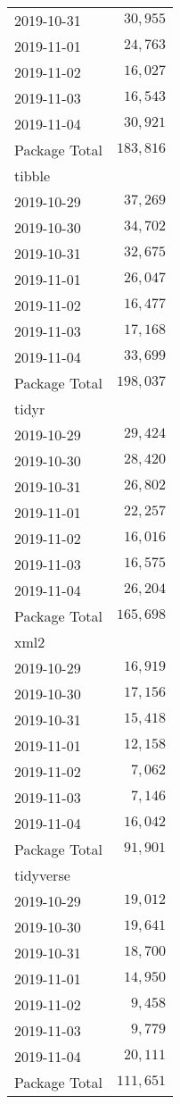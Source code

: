 \documentclass[]{article}
\begin{document}
\begin{longtable}{lr}
2019-10-31 & $30,955$ \\ 
2019-11-01 & $24,763$ \\ 
2019-11-02 & $16,027$ \\ 
2019-11-03 & $16,543$ \\ 
2019-11-04 & $30,921$ \\ 
\midrule 
Package Total & $183,816$ \\ 
\midrule
\multicolumn{1}{l}{tibble} \\ 
\midrule
2019-10-29 & $37,269$ \\ 
2019-10-30 & $34,702$ \\ 
2019-10-31 & $32,675$ \\ 
2019-11-01 & $26,047$ \\ 
2019-11-02 & $16,477$ \\ 
2019-11-03 & $17,168$ \\ 
2019-11-04 & $33,699$ \\ 
\midrule 
Package Total & $198,037$ \\ 
\midrule
\multicolumn{1}{l}{tidyr} \\ 
\midrule
2019-10-29 & $29,424$ \\ 
2019-10-30 & $28,420$ \\ 
2019-10-31 & $26,802$ \\ 
2019-11-01 & $22,257$ \\ 
2019-11-02 & $16,016$ \\ 
2019-11-03 & $16,575$ \\ 
2019-11-04 & $26,204$ \\ 
\midrule 
Package Total & $165,698$ \\ 
\midrule
\multicolumn{1}{l}{xml2} \\ 
\midrule
2019-10-29 & $16,919$ \\ 
2019-10-30 & $17,156$ \\ 
2019-10-31 & $15,418$ \\ 
2019-11-01 & $12,158$ \\ 
2019-11-02 & $7,062$ \\ 
2019-11-03 & $7,146$ \\ 
2019-11-04 & $16,042$ \\ 
\midrule 
Package Total & $91,901$ \\ 
\midrule
\multicolumn{1}{l}{tidyverse} \\ 
\midrule
2019-10-29 & $19,012$ \\ 
2019-10-30 & $19,641$ \\ 
2019-10-31 & $18,700$ \\ 
2019-11-01 & $14,950$ \\ 
2019-11-02 & $9,458$ \\ 
2019-11-03 & $9,779$ \\ 
2019-11-04 & $20,111$ \\ 
\midrule 
Package Total & $111,651$ \\ 
\bottomrule
\end{longtable}
\end{document}
